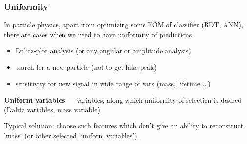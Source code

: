 \documentclass{beamer}
\begin{document}
\begin{frame}
    \frametitle{Uniformity}
    In particle physics, apart from optimizing some FOM of classifier (BDT, ANN), 
    there are cases when we need to have uniformity of predictions
    \begin{itemize}
    \item Dalitz-plot analysis (or any angular or amplitude analysis)

    \item search for a new particle (not to get fake peak)

    \item sensitivity for new signal 
        in wide range of vars (mass, lifetime ...)

    \end{itemize}

    \textbf{Uniform variables} --- variables, along which uniformity of selection is desired (Dalitz variables, mass variable).

    Typical solution: choose such features which don't give an ability to reconstruct 'mass' (or other selected 'uniform variables').
\end{frame}
\end{document}
